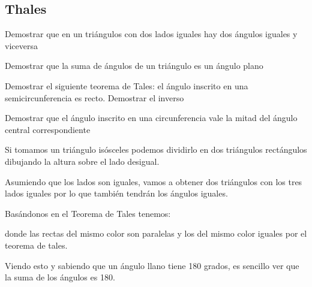 \subsection{Thales}
\begin{problem}[6]
\ppart Demostrar que en un triángulos con dos lados iguales hay dos ángulos iguales y viceversa

\ppart Demostrar que la suma de ángulos de un triángulo es un ángulo plano

\ppart Demostrar el siguiente teorema de Tales: el ángulo inscrito en una semicircunferencia es recto. Demostrar el inverso

\ppart Demostrar que el ángulo inscrito en una circunferencia vale la mitad del ángulo central correspondiente

\solution


\spart

Si tomamos un triángulo isósceles podemos dividirlo en dos triángulos rectángulos dibujando la altura sobre el lado desigual.

Asumiendo que los lados son iguales, vamos a obtener dos triángulos con los tres lados iguales por lo que también tendrán los ángulos iguales.

\spart

Basándonos en el Teorema de Tales tenemos:

\begin{center}
\end{center}

donde las rectas del mismo color son paralelas y los del mismo color iguales por el teorema de tales.

Viendo esto y sabiendo que un ángulo llano tiene 180 grados, es sencillo ver que la suma de los ángulos es 180.

\spart


\end{problem}

